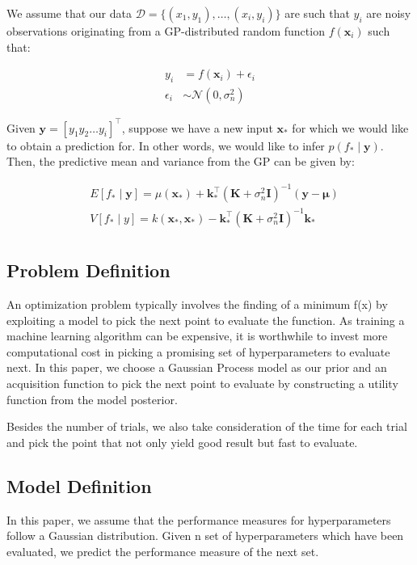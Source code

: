 \documentclass[letterpaper]{article}
\begin{document}
We assume that our data $\mathcal{D} = \{(x_1, y_1), \ldots, (x_i, y_i)\}$ are such that $y_i$ are noisy observations originating from a GP-distributed random function $f(\textbf{x}_i)$ such that:

\begin{align*}
	y_i &= f(\textbf{x}_i) + \epsilon_i \\
	\epsilon_i &\sim \mathcal{N}(0, \sigma_n^2)
\end{align*}

Given $\textbf{y} = [y_1y_2\ldots y_i]^\top$, suppose we have a new input $\textbf{x}_*$ for which we would like to obtain a prediction for. In other words, we would like to infer $p(f_* \mid \textbf{y})$. Then, the predictive mean and variance from the GP can be given by:

\begin{align*}
	&E[f_* \mid \textbf{y}] = \mu(\textbf{x}_*) + \textbf{k}_*^\top (\textbf{K} + \sigma_n^2 \textbf{I})^{-1} (\textbf{y} - \boldsymbol{\mu}) \\
	&V[f_* \mid y] = k(\textbf{x}_*, \textbf{x}_*) - \textbf{k}_*^\top (\textbf{K} + \sigma_n^2 \textbf{I})^{-1} \textbf{k}_* \\
\end{align*}

\subsection{Problem Definition}
An optimization problem typically involves the finding of a minimum f(x) by exploiting a model to pick the next point to evaluate the function. As training a machine learning algorithm can be expensive, it is worthwhile to invest more computational cost in picking a promising set of hyperparameters to evaluate next. In this paper, we choose a Gaussian Process model as our prior and an acquisition function to pick the next point to evaluate by constructing a utility function from the model posterior. 

Besides the number of trials, we also take consideration of the time for each trial and pick the point that not only yield good result but fast to evaluate. 
\subsection{Model Definition}
In this paper, we assume that the performance measures for hyperparameters follow a Gaussian distribution. Given n set of hyperparameters which have been evaluated, we predict the performance measure of the next set.
\end{document}
